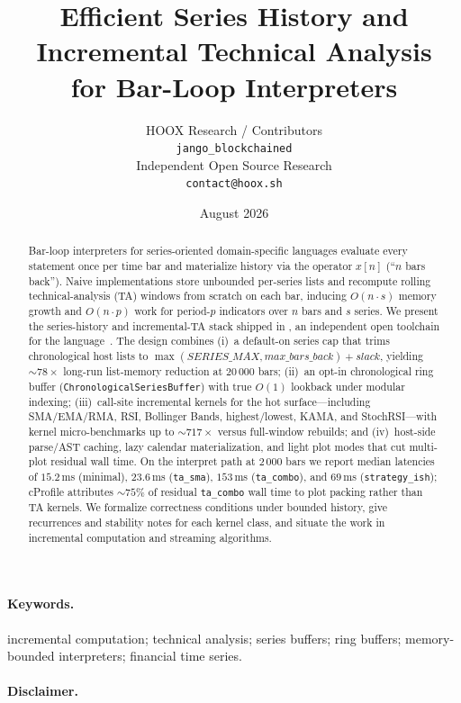 \documentclass[11pt,a4paper]{article}
\title{%
  Efficient Series History and Incremental Technical Analysis\\
  for Bar-Loop Interpreters}
\author{%
  HOOX Research / \pyne{} Contributors\\
  \texttt{jango\_blockchained}\\
  Independent Open Source Research\\
  \texttt{contact@hoox.sh}}
\date{August 2026}
\begin{document}
\maketitle

\begin{abstract}
Bar-loop interpreters for series-oriented domain-specific languages evaluate
every statement once per time bar and materialize history via the operator
$x[n]$ (``$n$ bars back'').  Naive implementations store unbounded per-series
lists and recompute rolling technical-analysis (TA) windows from scratch on
each bar, inducing $O(n\cdot s)$ memory growth and $O(n\cdot p)$ work for
period-$p$ indicators over $n$ bars and $s$ series.
We present the series-history and incremental-TA stack shipped in \pyne{}, an
independent open toolchain for the \pine{} language~\citep{pynescript2026,tradingview-pine}.
The design combines (i)~a default-on series cap that trims chronological host
lists to $\max(\mathit{SERIES\_MAX},\mathit{max\_bars\_back})+\mathit{slack}$,
yielding $\sim 78\times$ long-run list-memory reduction at $20\,000$ bars;
(ii)~an opt-in chronological ring buffer (\texttt{ChronologicalSeriesBuffer})
with true $O(1)$ lookback under modular indexing;
(iii)~call-site incremental kernels for the hot \ta{} surface---including
SMA/EMA/RMA, RSI, Bollinger Bands, highest/lowest, KAMA, and StochRSI---with
kernel micro-benchmarks up to $\sim 717\times$ versus full-window rebuilds; and
(iv)~host-side parse/AST caching, lazy calendar materialization, and light plot
modes that cut multi-plot residual wall time.
On the interpret path at $2\,000$ bars we report median latencies of $15.2$\,ms
(minimal), $23.6$\,ms (\texttt{ta\_sma}), $153$\,ms (\texttt{ta\_combo}), and
$69$\,ms (\texttt{strategy\_ish}); cProfile attributes $\sim 75\%$ of residual
\texttt{ta\_combo} wall time to plot packing rather than TA kernels.
We formalize correctness conditions under bounded history, give recurrences and
stability notes for each kernel class, and situate the work in incremental
computation and streaming algorithms.
\end{abstract}

\paragraph{Keywords.}
incremental computation; technical analysis; series buffers; ring buffers;
memory-bounded interpreters; financial time series.

\paragraph{Disclaimer.}
\trademarknote{}
\end{document}
